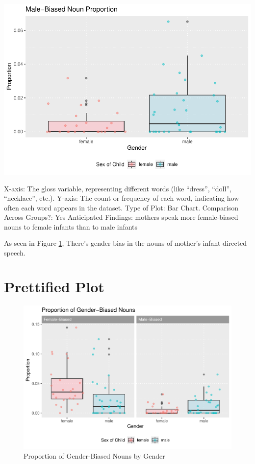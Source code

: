 \documentclass[
  man]{apa6}
\begin{document}
\includegraphics{My-Notebook_files/figure-latex/male-nouns-1.pdf}

X-axis: The gloss variable, representing different words (like ``dress'', ``doll'', ``necklace'', etc.). Y-axis: The count or frequency of each word, indicating how often each word appears in the dataset. Type of Plot: Bar Chart. Comparison Across Groups?: Yes Anticipated Findings: mothers speak more female-biased nouns to female infants than to male infants

As seen in Figure \ref{fig:my-figure}, There's gender bias in the nouns of mother's infant-directed speech.

\hypertarget{prettified-plot}{%
\section{Prettified Plot}\label{prettified-plot}}

\begin{figure}
\centering
\includegraphics{My-Notebook_files/figure-latex/my-figure-1.pdf}
\caption{\label{fig:my-figure}Proportion of Gender-Biased Nouns by Gender}
\end{figure}
\end{document}
